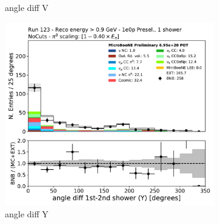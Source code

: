 \begin{figure}[H]
\begin{subfigure}{0.3\textwidth}
    \caption{angle diff V}
    \end{subfigure}
    \begin{subfigure}{0.3\textwidth}
    \includegraphics[width=1.0\textwidth]{1e0p/High_E_Sideband/anglediff_Y.pdf}
    \caption{angle diff Y}
    \end{subfigure}
    \caption{} 
    \label{fig:HE_1eNp_1}
\end{figure}

